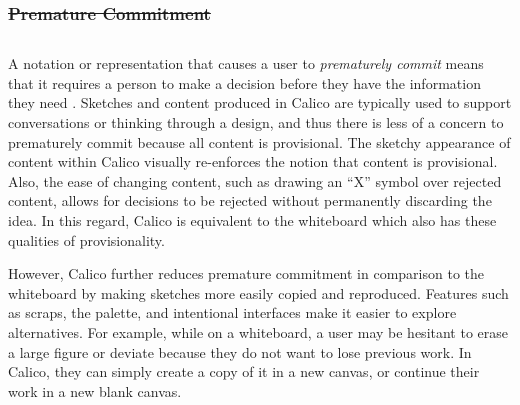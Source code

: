 \documentclass[12pt,fleqn]{ucithesis}
\providecommand{\DIFaddtex}[1]{{\protect\color{blue}\uwave{#1}}} %
\providecommand{\DIFdeltex}[1]{{\protect\color{red}\sout{#1}}}                      %
\providecommand{\DIFaddbegin}{} %
\providecommand{\DIFaddend}{} %
\providecommand{\DIFdelend}{} %
\providecommand{\DIFadd}[1]{\texorpdfstring{\DIFaddtex{#1}}{#1}} %
\providecommand{\DIFdel}[1]{\texorpdfstring{\DIFdeltex{#1}}{}} %
\begin{document}
\subsubsection{\DIFdel{Premature Commitment}}
\addtocounter{subsubsection}{-1}%
\DIFdelend \DIFaddbegin \subsection{\DIFadd{Premature Commitment}}
\DIFaddend A notation or representation that causes a user to \textit{prematurely commit} means that it requires a person to make a decision before they have the information they need \cite{Petre2013BookChapter}. Sketches and content produced in Calico are typically used to support conversations or thinking through a design, and thus there is less of a concern to prematurely commit because all content is provisional. The sketchy appearance of content within Calico visually re-enforces the notion that content is provisional. Also, the ease of changing content, such as drawing an ``X'' symbol over rejected content, allows for decisions to be rejected without permanently discarding the idea. In this regard, Calico is equivalent to the whiteboard which also has these qualities of provisionality. 

However, Calico further reduces premature commitment in comparison to the whiteboard by making sketches more easily copied and reproduced. Features such as scraps, the palette, and intentional interfaces make it easier to explore alternatives. For example, while on a whiteboard, a user may be hesitant to erase a large figure or deviate because they do not want to lose previous work. In Calico, they can simply create a copy of it in a new canvas, or continue their work in a new blank canvas.

\end{document}
